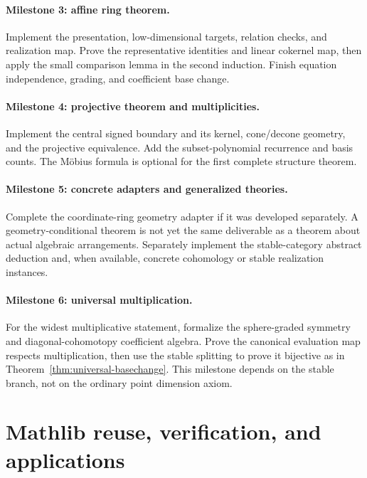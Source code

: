 \documentclass[11pt]{article}
\theoremstyle{definition}
\theoremstyle{remark}
\begin{document}
\paragraph{Milestone 3: affine ring theorem.}
Implement the presentation, low-dimensional targets, relation checks, and realization map. Prove the representative identities and linear cokernel map, then apply the small comparison lemma in the second induction. Finish equation independence, grading, and coefficient base change.

\paragraph{Milestone 4: projective theorem and multiplicities.}
Implement the central signed boundary and its kernel, cone/decone geometry, and the projective equivalence. Add the subset-polynomial recurrence and basis counts. The M\"obius formula is optional for the first complete structure theorem.

\paragraph{Milestone 5: concrete adapters and generalized theories.}
Complete the coordinate-ring geometry adapter if it was developed separately. A geometry-conditional theorem is not yet the same deliverable as a theorem about actual algebraic arrangements. Separately implement the stable-category abstract deduction and, when available, concrete cohomology or stable realization instances.

\paragraph{Milestone 6: universal multiplication.}
For the widest multiplicative statement, formalize the sphere-graded symmetry and diagonal-cohomotopy coefficient algebra. Prove the canonical evaluation map respects multiplication, then use the stable splitting to prove it bijective as in Theorem~\ref{thm:universal-basechange}. This milestone depends on the stable branch, not on the ordinary point dimension axiom.

\section{Mathlib reuse, verification, and applications}
\end{document}
